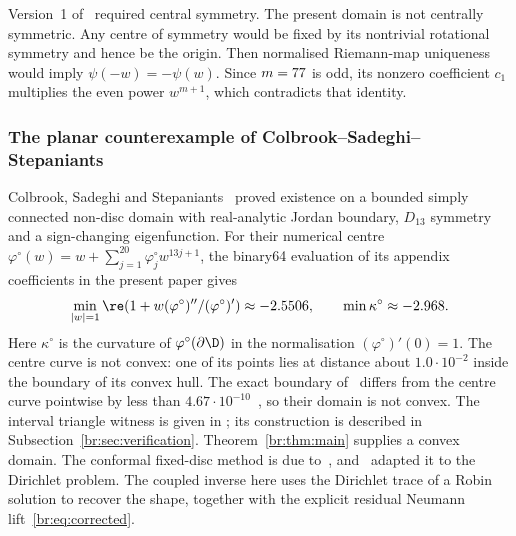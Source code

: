 Version~1 of~\cite{DSWZ25} required central symmetry. The present
domain is not centrally symmetric. Any centre of symmetry would be
fixed by its nontrivial rotational symmetry and hence be the origin.
Then normalised Riemann-map uniqueness would imply $\psi(-w)=-\psi(w)$.
Since $m=77$ is odd, its nonzero coefficient $c_1$ multiplies the
even power $w^{m+1}$, which contradicts that identity.

\subsubsection{The planar counterexample of Colbrook--Sadeghi--Stepaniants}
Colbrook, Sadeghi and Stepaniants~\cite{CSS26} proved existence on
a bounded simply connected non-disc domain with real-analytic Jordan
boundary, $D_{13}$ symmetry and a sign-changing eigenfunction.
For their numerical centre
$\varphi^\circ(w)=w+\sum_{j=1}^{20}\varphi_j^\circ w^{13j+1}$,
the binary64 evaluation of its appendix coefficients in the present paper gives
\begin{equation}\label{br:eq:CSS-computation}
 \min_{|w|=1}\re(1+w(\varphi^\circ)''/(\varphi^\circ)')
       \approx\brCSSConvexDiagnostic,\qquad
 \min\kappa^\circ\approx\brCSSCurvatureDiagnostic.
\end{equation}
Here $\kappa^\circ$ is the curvature of
$\varphi^\circ(\partial\D)$ in the normalisation
$(\varphi^\circ)'(0)=1$. The centre curve is not convex: one of its
points lies at distance about $1.0\cdot10^{-2}$ inside the boundary of
its convex hull. The exact boundary of~\cite{CSS26} differs from the
centre curve pointwise by less than $4.67\cdot10^{-10}$~\cite[Subsection~5.1]{CSS26},
so their domain is not convex. The interval triangle witness is given in
; its construction is
described in Subsection~\ref{br:sec:verification}.
Theorem~\ref{br:thm:main} supplies a convex domain.
The conformal fixed-disc method is due to~\cite{CS26},
and~\cite{CSS26} adapted it to the Dirichlet problem. The coupled inverse here uses the Dirichlet trace of
a Robin solution to recover the shape, together with the explicit
residual Neumann lift~\eqref{br:eq:corrected}.

